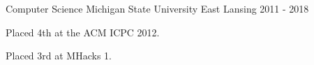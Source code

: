 
\begin{cventries}
    {Computer Science} %
    {Michigan State University} %
    {East Lansing} %
    {2011 - 2018} %
    {
        \begin{cvitems}
            \item {Placed 4th at the ACM ICPC 2012.}
            \item {Placed 3rd at MHacks 1.}
        \end{cvitems}
    }
\end{cventries}
